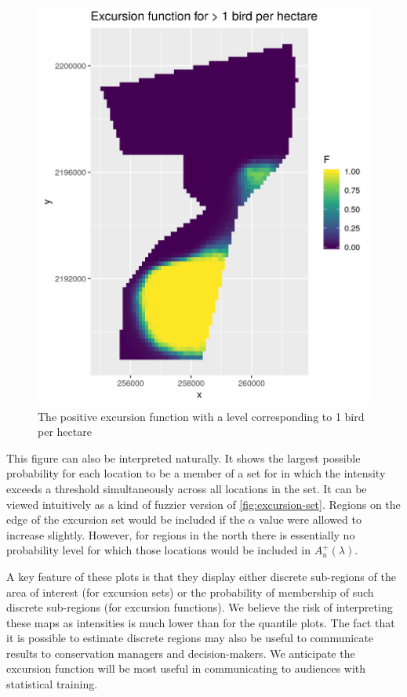\documentclass[preprint,12pt]{elsarticle}
\begin{document}
\begin{figure}
	\includegraphics[scale=0.5]{figures/excursion_function.png}
	\caption{The positive excursion function with a level corresponding to 1 bird per hectare}
	\label{fig:excursion-function}
\end{figure}

This figure can also be interpreted naturally.  It shows the largest possible probability for each location to be a member of a set for in which the intensity exceeds a threshold simultaneously across all locations in the set.  It can be viewed intuitively as a kind of fuzzier version of \autoref{fig:excursion-set}.  Regions on the edge of the excursion set would be included if the $\alpha$ value were allowed to increase slightly.  However, for regions in the north there is essentially no probability level for which those locations would be included in $A_u^{+}(\lambda)$.  

  A key feature of these plots is that they display either discrete sub-regions of the area of interest (for excursion sets) or the probability of membership of such discrete sub-regions (for excursion functions).  We believe the risk of interpreting these maps as intensities is much lower than for the quantile plots.  The fact that it is possible to estimate discrete regions may also be useful to communicate results to conservation managers and decision-makers.  We anticipate the excursion function will be most useful in communicating to audiences with statistical training.  
\end{document}

